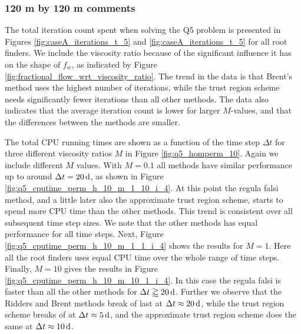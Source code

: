\subsubsection{120 m by 120 m comments}
The total iteration count spent when solving the Q5 problem is presented in Figures \ref{fig:caseA_iterations_t_5} and \ref{fig:caseA_iterations_t_5} for all root finders. We include the viscosity ratio because of the significant influence it has on the shape of $f_w$, as indicated by Figure \ref{fig:fractional_flow_wrt_viscosity_ratio}. The trend in the data is that Brent's method uses the highest number of iterations, while the trust region scheme needs significantly fewer iterations than all other methods. The data also indicates that the average iteration count is lower for larger $M$-values, and that the differences between the methods are smaller.

The total CPU running times are shown as a function of the time step $\Delta t$ for three different viscosity ratios $M$ in Figure \ref{fig:q5_homperm_10}. Again we include different $M$ values. With $M = 0.1$ all methods have similar performance up to around $\Delta t = \unit[20]{d}$, as shown in Figure \ref{fig:q5_cputime_perm_h_10_m_1_10_i_4}. At this point the regula falsi method, and a little later also the approximate trust region scheme, starts to spend more CPU time than the other methods. This trend is consistent over all subsequent time step sizes. We note that the other methods has equal performance for all time steps.
Next, Figure \ref{fig:q5_cputime_perm_h_10_m_1_1_i_4} shows the results for $M = 1$. Here all the root finders uses equal CPU time over the whole range of time steps.
Finally, $M = 10$ gives the results in Figure \ref{fig:q5_cputime_perm_h_10_m_10_1_i_4}. In this case the regula falsi is faster than all the other methods for $\Delta t \gtrapprox \unit[20]{d}$. Further we observe that the Ridders and Brent methods break of last at $\Delta t \approx \unit[20]{d}$, while the trust region scheme breaks of at $\Delta t \approx \unit[5]{d}$, and the approximate trust region scheme does the same at $\Delta t \approx \unit[10]{d}$.




